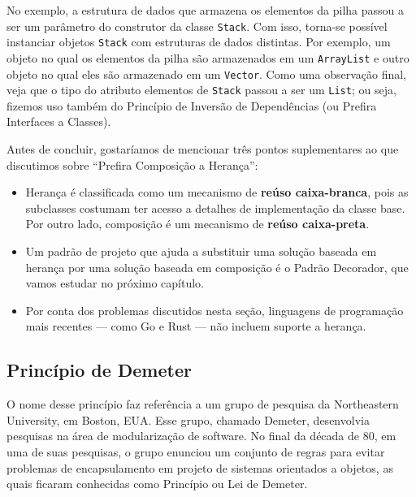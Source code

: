 \documentclass[
  11pt,
  twoside]{book}
\newcommand{\passthrough}[1]{#1}
\begin{document}
No exemplo, a estrutura de dados que armazena os elementos da pilha
passou a ser um parâmetro do construtor da classe
\passthrough{\lstinline!Stack!}. Com isso, torna-se possível instanciar
objetos \passthrough{\lstinline!Stack!} com estruturas de dados
distintas. Por exemplo, um objeto no qual os elementos da pilha são
armazenados em um \passthrough{\lstinline!ArrayList!} e outro objeto no
qual eles são armazenado em um \passthrough{\lstinline!Vector!}. Como
uma observação final, veja que o tipo do atributo elementos de
\passthrough{\lstinline!Stack!} passou a ser um
\passthrough{\lstinline!List!}; ou seja, fizemos uso também do Princípio
de Inversão de Dependências (ou Prefira Interfaces a Classes).

Antes de concluir, gostaríamos de mencionar três pontos suplementares ao
que discutimos sobre ``Prefira Composição a Herança'':

\begin{itemize}
\item
  Herança é classificada como um mecanismo de \textbf{reúso
  caixa-branca}, pois as subclasses costumam ter acesso a detalhes de
  implementação da classe base. 
   Por outro lado, composição é um mecanismo
  de \textbf{reúso caixa-preta}.
\item
  Um padrão de projeto que ajuda a substituir uma solução baseada em
  herança por uma solução baseada em composição é o Padrão Decorador,
  que vamos estudar no próximo capítulo.
\item
  Por conta dos problemas discutidos nesta seção, 
   linguagens de programação mais recentes --- como Go e
  Rust --- não incluem suporte a herança.
\end{itemize}

\hypertarget{princuxedpio-de-demeter}{%
\subsection{Princípio de Demeter}\label{princuxedpio-de-demeter}}

 

O nome desse princípio faz referência a um grupo de pesquisa da
Northeastern University, em Boston, EUA. Esse grupo, chamado Demeter,
desenvolvia pesquisas na área de modularização de software. No final da
década de 80, em uma de suas pesquisas, o grupo enunciou um conjunto de
regras para evitar problemas de encapsulamento em projeto de sistemas
orientados a objetos, as quais ficaram conhecidas como Princípio ou Lei
de Demeter.
\end{document}
